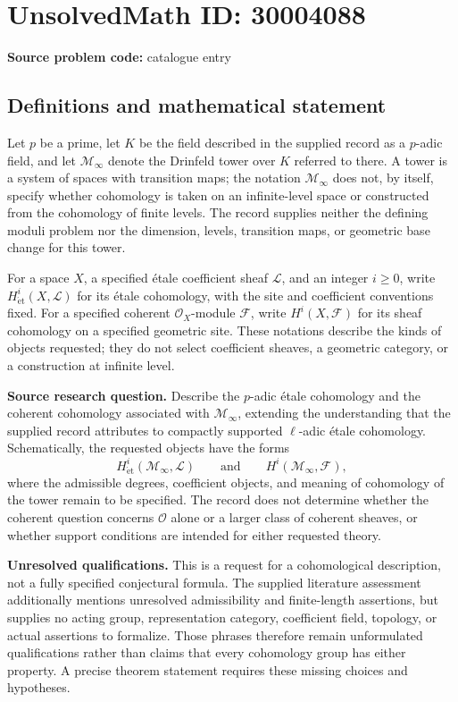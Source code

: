 \documentclass[11pt]{article}
\begin{document}
\section*{UnsolvedMath ID: 30004088}
\textbf{Source problem code:} catalogue entry
\subsection{Definitions and mathematical statement}
Let \(p\) be a prime, let \(K\) be the field described in the supplied record as a \(p\)-adic field, and let \(\mathcal M_\infty\) denote the Drinfeld tower over \(K\) referred to there. A tower is a system of spaces with transition maps; the notation \(\mathcal M_\infty\) does not, by itself, specify whether cohomology is taken on an infinite-level space or constructed from the cohomology of finite levels. The record supplies neither the defining moduli problem nor the dimension, levels, transition maps, or geometric base change for this tower.

For a space \(X\), a specified étale coefficient sheaf \(\mathscr L\), and an integer \(i\geq 0\), write \(H^i_{\mathrm{\acute et}}(X,\mathscr L)\) for its étale cohomology, with the site and coefficient conventions fixed. For a specified coherent \(\mathcal O_X\)-module \(\mathscr F\), write \(H^i(X,\mathscr F)\) for its sheaf cohomology on a specified geometric site. These notations describe the kinds of objects requested; they do not select coefficient sheaves, a geometric category, or a construction at infinite level.

\textbf{Source research question.} Describe the \(p\)-adic étale cohomology and the coherent cohomology associated with \(\mathcal M_\infty\), extending the understanding that the supplied record attributes to compactly supported \(\ell\)-adic étale cohomology. Schematically, the requested objects have the forms
\[
H^i_{\mathrm{\acute et}}(\mathcal M_\infty,\mathscr L)
\qquad\text{and}\qquad
H^i(\mathcal M_\infty,\mathscr F),
\]
where the admissible degrees, coefficient objects, and meaning of cohomology of the tower remain to be specified. The record does not determine whether the coherent question concerns \(\mathcal O\) alone or a larger class of coherent sheaves, or whether support conditions are intended for either requested theory.

\textbf{Unresolved qualifications.} This is a request for a cohomological description, not a fully specified conjectural formula. The supplied literature assessment additionally mentions unresolved admissibility and finite-length assertions, but supplies no acting group, representation category, coefficient field, topology, or actual assertions to formalize. Those phrases therefore remain unformulated qualifications rather than claims that every cohomology group has either property. A precise theorem statement requires these missing choices and hypotheses.
\end{document}
